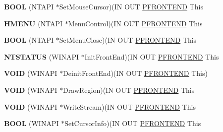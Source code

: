 \begin{DoxyCompactItemize}
{\bfseries B\+O\+OL} (N\+T\+A\+PI $\ast$Set\+Mouse\+Cursor)(IN O\+UT \hyperlink{struct___f_r_o_n_t_e_n_d}{P\+F\+R\+O\+N\+T\+E\+ND} This
\item 
\mbox{\label{struct___f_r_o_n_t_e_n_d___v_t_b_l_a7fc183f04a48c7fe82acd4c3ee44b1e9}} 
{\bfseries H\+M\+E\+NU} (N\+T\+A\+PI $\ast$Menu\+Control)(IN O\+UT \hyperlink{struct___f_r_o_n_t_e_n_d}{P\+F\+R\+O\+N\+T\+E\+ND} This
\item 
\mbox{\label{struct___f_r_o_n_t_e_n_d___v_t_b_l_a7741c3511b51568417dea762eaf0a2a8}} 
{\bfseries B\+O\+OL} (N\+T\+A\+PI $\ast$Set\+Menu\+Close)(IN O\+UT \hyperlink{struct___f_r_o_n_t_e_n_d}{P\+F\+R\+O\+N\+T\+E\+ND} This
\item 
\mbox{\label{struct___f_r_o_n_t_e_n_d___v_t_b_l_a325cbf766086777bf2c9a51ebc6385e0}} 
{\bfseries N\+T\+S\+T\+A\+T\+US} (W\+I\+N\+A\+PI $\ast$Init\+Front\+End)(IN O\+UT \hyperlink{struct___f_r_o_n_t_e_n_d}{P\+F\+R\+O\+N\+T\+E\+ND} This
\item 
\mbox{\label{struct___f_r_o_n_t_e_n_d___v_t_b_l_aae9165441dee274c0cb4c09ee2de4475}} 
{\bfseries V\+O\+ID} (W\+I\+N\+A\+PI $\ast$Deinit\+Front\+End)(IN O\+UT \hyperlink{struct___f_r_o_n_t_e_n_d}{P\+F\+R\+O\+N\+T\+E\+ND} This)
\item 
\mbox{\label{struct___f_r_o_n_t_e_n_d___v_t_b_l_afef5071702b85b76f35c0f4210d10e56}} 
{\bfseries V\+O\+ID} (W\+I\+N\+A\+PI $\ast$Draw\+Region)(IN O\+UT \hyperlink{struct___f_r_o_n_t_e_n_d}{P\+F\+R\+O\+N\+T\+E\+ND} This
\item 
\mbox{\label{struct___f_r_o_n_t_e_n_d___v_t_b_l_a82a50e98a904d0eb1f8ebbe367171597}} 
{\bfseries V\+O\+ID} (W\+I\+N\+A\+PI $\ast$Write\+Stream)(IN O\+UT \hyperlink{struct___f_r_o_n_t_e_n_d}{P\+F\+R\+O\+N\+T\+E\+ND} This
\item 
\mbox{\label{struct___f_r_o_n_t_e_n_d___v_t_b_l_a57a79065beac70586c9f6058093ef51b}} 
{\bfseries B\+O\+OL} (W\+I\+N\+A\+PI $\ast$Set\+Cursor\+Info)(IN O\+UT \hyperlink{struct___f_r_o_n_t_e_n_d}{P\+F\+R\+O\+N\+T\+E\+ND} This
\item 

\end{DoxyCompactItemize}
